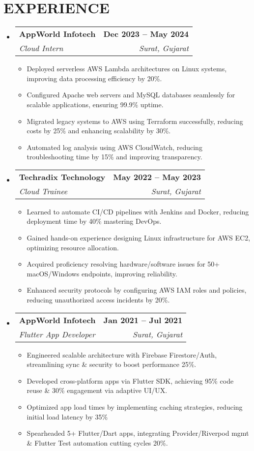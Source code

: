 \documentclass[letterpaper,11pt]{article}
\makeatletter
\newcommand{\resumeItem}[1]{
  \item\small{
    {#1 \vspace{-2pt}}
  }
}
\newcommand{\resumeSubheading}[4]{
  \vspace{-2pt}\item
    \begin{tabular*}{1.0\textwidth}[t]{l@{\extracolsep{\fill}}r}
      \textbf{#1} & \textbf{\small #2} \\
      \textit{\small#3} & \textit{\small #4} \\
    \end{tabular*}\vspace{-7pt}
}
\newcommand{\resumeSubHeadingListStart}{\begin{itemize}[leftmargin=0.0in, label={}]}
\newcommand{\resumeSubHeadingListEnd}{\end{itemize}}
\newcommand{\resumeItemListStart}{\begin{itemize}}
\newcommand{\resumeItemListEnd}{\end{itemize}\vspace{-5pt}}
\makeatother
\begin{document}
\section{EXPERIENCE}
  \resumeSubHeadingListStart
      \resumeSubheading
      {AppWorld Infotech}{Dec 2023 -- May 2024}
      {Cloud Intern}{Surat, Gujarat}
      \resumeItemListStart
        \resumeItem{Deployed serverless AWS Lambda architectures on Linux systems, improving data processing efficiency by 20\%.}
        \resumeItem{Configured Apache web servers and MySQL databases seamlessly for scalable applications, ensuring 99.9\% uptime.}
        \resumeItem{Migrated legacy systems to AWS using Terraform successfully, reducing costs by 25\% and enhancing scalability by 30\%.}
        \resumeItem{Automated log analysis using AWS CloudWatch, reducing troubleshooting time by 15\% and improving transparency.}
    \resumeItemListEnd
\vspace{-7pt}
    \resumeSubheading
      {Techradix Technology}{May 2022 -- May 2023}
      {Cloud Trainee}{Surat, Gujarat}
      \resumeItemListStart
        \resumeItem{Learned to automate CI/CD pipelines with Jenkins and Docker, reducing deployment time by 40\% mastering DevOps.}
        \resumeItem{Gained hands-on experience designing Linux infrastructure for AWS EC2, optimizing resource allocation.}
        \resumeItem{Acquired proficiency resolving hardware/software issues for 50+ macOS/Windows endpoints, improving reliability.}
        \resumeItem{Enhanced security protocols by configuring AWS IAM roles and policies, reducing unauthorized access incidents by 20\%.}
    \resumeItemListEnd
    \vspace{-16pt}
    \resumeSubheading
      {AppWorld Infotech}{Jan 2021 -- Jul 2021}
      {Flutter App Developer }{Surat, Gujarat}
      \resumeItemListStart
        \resumeItem{Engineered scalable architecture with Firebase Firestore/Auth, streamlining sync \& security to boost performance 25\%.}
        \resumeItem{Developed cross-platform apps via Flutter SDK, achieving 95\% code reuse \& 30\% engagement via adaptive UI/UX. }
        \resumeItem{Optimized app load times by implementing caching strategies, reducing initial load latency by 35\%}
        \resumeItem{Spearheaded 5+ Flutter/Dart apps, integrating Provider/Riverpod mgmt \& Flutter Test automation cutting cycles 20\%.}
        
    \resumeItemListEnd
    \resumeSubHeadingListEnd
  
\vspace{-30pt}
\end{document}
